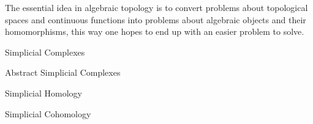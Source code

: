 \documentclass[../main.tex]{subfiles}
\begin{document}
    The essential idea in algebraic topology is to convert problems about topological spaces and continuous functions into
    problems about algebraic objects and their homomorphisms, this way one hopes to end up with an easier problem to solve. 
    \begin{section}{Simplicial Complexes} 
            
    \end{section}
    \begin{section}{Abstract Simplicial Complexes} 
            
    \end{section}
    \begin{section}{Simplicial Homology}
          
        \label{sec:1:3}  
    \end{section}
    \begin{section}{Simplicial Cohomology}
         
        \label{sec:1:4}
    \end{section}
\end{document}
